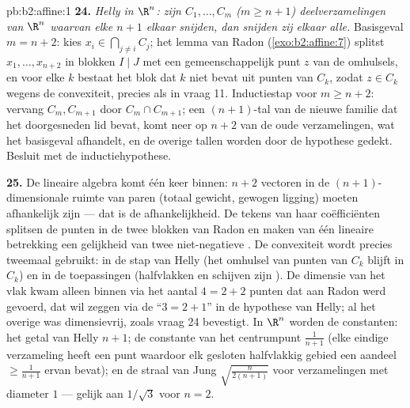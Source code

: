 \begin{solution}{pb:b2:affine:1}
\textbf{24.} \emph{Helly in $\R^n$: zijn $C_1, \dots, C_m$ ($m \geq
n + 1$)  deelverzamelingen van $\R^n$ waarvan elke $n + 1$
elkaar snijden, dan snijden zij elkaar alle.} Basisgeval $m = n +
2$: kies $x_i \in \bigcap_{j\neq i}C_j$; het lemma van Radon
(\cref{exo:b2:affine:7}) splitst $x_1, \dots, x_{n+2}$ in blokken
$I \mid J$ met een gemeenschappelijk punt $z$ van de omhulsels, en
voor elke $k$ bestaat het blok dat $k$ niet bevat uit punten van
$C_k$, zodat $z \in C_k$ wegens de convexiteit, precies als in
vraag 11. Inductiestap voor $m \geq n + 2$: vervang $C_m, C_{m+1}$
door $C_m \cap C_{m+1}$; een $(n+1)$-tal van de nieuwe familie dat
het doorgesneden lid bevat, komt neer op $n + 2$ van de oude
verzamelingen, wat het basisgeval afhandelt, en de overige tallen
worden door de hypothese gedekt. Besluit met de inductiehypothese.

\textbf{25.} De lineaire algebra komt één keer binnen: $n + 2$
vectoren in de $(n+1)$-dimensionale ruimte van paren (totaal
gewicht, gewogen ligging) moeten afhankelijk zijn --- dat is de
 afhankelijkheid. De tekens van haar coëfficiënten splitsen
de punten in de twee blokken van Radon en maken van één lineaire
betrekking een gelijkheid van twee niet-negatieve . De
convexiteit wordt precies tweemaal gebruikt: in de stap van Helly
(het omhulsel van punten van $C_k$ blijft in $C_k$) en in de
toepassingen (halfvlakken en schijven zijn ). De dimensie van
het vlak kwam alleen binnen via het aantal $4 = 2 + 2$ punten dat
aan Radon werd gevoerd, dat wil zeggen via de ``$3 = 2 + 1$'' in de
hypothese van Helly; al het overige was dimensievrij, zoals vraag
24 bevestigt. In $\R^n$ worden de constanten: het getal van Helly
$n + 1$; de constante van het centrumpunt $\frac1{n+1}$ (elke
eindige verzameling heeft een punt waardoor elk gesloten
halfvlakkig gebied een aandeel $\geq \frac1{n+1}$ ervan bevat); en
de straal van Jung $\sqrt{\frac{n}{2(n+1)}}$ voor verzamelingen met
diameter $1$ --- gelijk aan $1/\sqrt3$ voor $n = 2$.
\end{solution}
